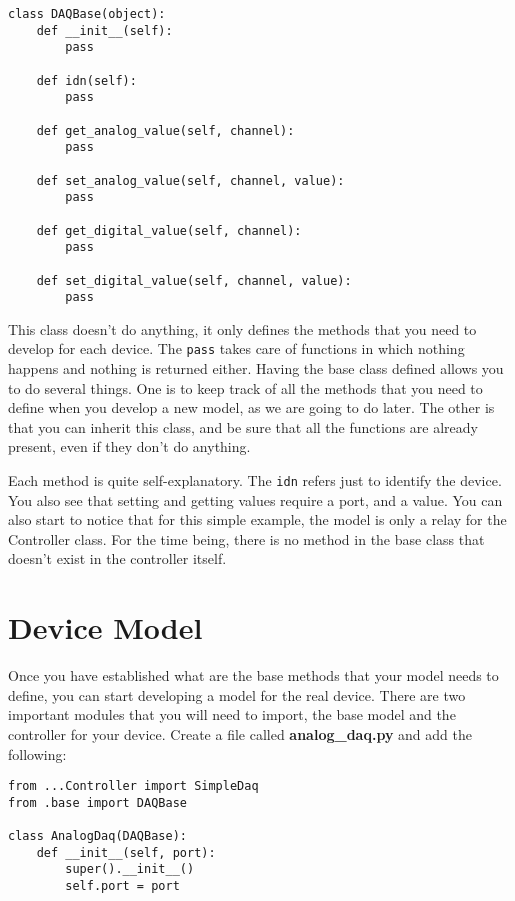 \begin{verbatim}
class DAQBase(object):
    def __init__(self):
        pass
    
    def idn(self):
        pass
    
    def get_analog_value(self, channel):
        pass
    
    def set_analog_value(self, channel, value):
        pass
    
    def get_digital_value(self, channel):
        pass
    
    def set_digital_value(self, channel, value):
        pass
\end{verbatim}

This class doesn't do anything, it only defines the methods that you
need to develop for each device. The \texttt{pass} takes care of
functions in which nothing happens and nothing is returned either.
Having the base class defined allows you to do several things. One is to
keep track of all the methods that you need to define when you develop a new model, as we are going to do later. The other is that you can
inherit this class, and be sure that all the functions are already
present, even if they don't do anything.

Each method is quite self-explanatory. The \texttt{idn} refers just to
identify the device. You also see that setting and getting values
require a port, and a value. You can also start to notice that for this
simple example, the model is only a relay for the Controller class. For
the time being, there is no method in the base class that doesn't exist
in the controller itself.

\section{Device Model}\label{devicemodel}
Once you have established what are the base methods that your model
needs to define, you can start developing a model for the real device.
There are two important modules that you will need to import, the base
model and the controller for your device. Create a file called
\textbf{analog\_daq.py} and add the following:

\begin{verbatim}
from ...Controller import SimpleDaq
from .base import DAQBase

class AnalogDaq(DAQBase):
    def __init__(self, port):
        super().__init__()
        self.port = port
\end{verbatim}

